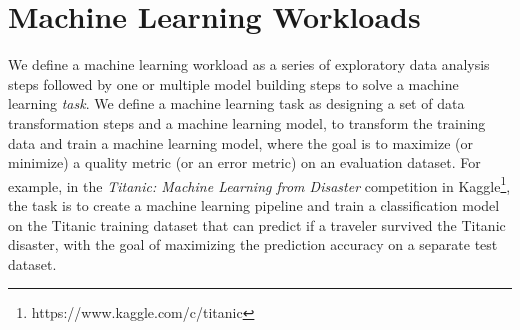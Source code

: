 \section{Machine Learning Workloads} \label{sec-ml-workloads}
We define a machine learning workload as a series of exploratory data analysis steps followed by one or multiple model building steps to solve a machine learning \textit{task}.
We define a machine learning task as designing a set of data transformation steps and a machine learning model, to transform the training data and train a machine learning model, where the goal is to maximize (or minimize) a quality metric (or an error metric) on an evaluation dataset.
For example, in the \textit{Titanic: Machine Learning from Disaster} competition in Kaggle\footnote{https://www.kaggle.com/c/titanic}, the task is to create a machine learning pipeline and train a classification model on the Titanic training dataset that can predict if a traveler survived the Titanic disaster, with the goal of maximizing the prediction accuracy on a separate test dataset.

